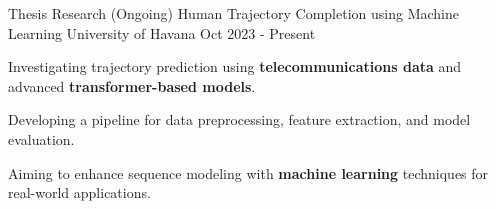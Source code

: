 \cventry
    {Thesis Research (Ongoing)}
    {Human Trajectory Completion using Machine Learning}
    {University of Havana}
    {Oct 2023 - Present}
    {
      \begin{cvitems}
        \item {Investigating trajectory prediction using \textbf{telecommunications data} and advanced \textbf{transformer-based models}.}
        \item {Developing a pipeline for data preprocessing, feature extraction, and model evaluation.}
        \item {Aiming to enhance sequence modeling with \textbf{machine learning} techniques for real-world applications.}
      \end{cvitems}
    }

